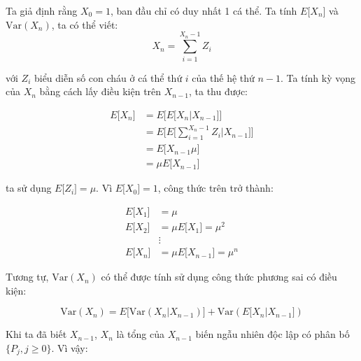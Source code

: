 \documentclass[14pt, a4paper]{article}
\numberwithin{equation}{section}
\numberwithin{figure}{section}
\theoremstyle{sltheorem}
\theoremstyle{soltheorem}
\numberwithin{dl}{section}
\numberwithin{vd}{section}
\begin{document}
    Ta giả định rằng $X_0 = 1$, ban đầu chỉ có duy nhất 1 cá thể.
    Ta tính $E \lbrack X_n \rbrack$ và $\mathrm{Var} (X_n)$, ta có thể viết:
    \begin{equation*}
        X_n = \sum_{i=1}^{X_n - 1} Z_i
    \end{equation*}

    với $Z_i$ biểu diễn số con cháu ở cá thể thứ $i$ của thế hệ thứ $n-1$.
    Ta tính kỳ vọng của $X_n$ bằng cách lấy điều kiện trên $X_{n-1}$, ta thu được:

    \begin{equation*}
        \begin{aligned}
            E \lbrack X_n \rbrack &= E \lbrack E \lbrack X_n \vert X_{n-1} \rbrack \rbrack \\
            &= E \Bigg \lbrack E \Bigg \lbrack \sum_{i=1}^{X_n - 1} Z_i \vert X_{n-1} \Bigg \rbrack \Bigg \rbrack \\
            &= E \lbrack X_{n-1} \mu \rbrack \\
            &= \mu E \lbrack X_{n-1} \rbrack
        \end{aligned}
    \end{equation*}

    ta sử dụng $E \lbrack Z_i \rbrack = \mu$. Vì $E \lbrack X_0 \rbrack = 1$, công thức trên trở thành:

    \begin{equation*}
        \begin{aligned}
            E \lbrack X_1 \rbrack &= \mu \\
            E \lbrack X_2 \rbrack &= \mu E \lbrack X_1 \rbrack = \mu^2 \\
            & \vdots \\
            E \lbrack X_n \rbrack &= \mu E \lbrack X_{n-1} \rbrack = \mu^n
        \end{aligned}
    \end{equation*}

    Tương tự, $\mathrm{Var} (X_n)$ có thể được tính sử dụng công thức phương sai có điều kiện:

    \begin{equation*}
        \mathrm{Var} (X_n) = E \lbrack \mathrm{Var} (X_n \vert X_{n-1}) \rbrack + \mathrm{Var} (E \lbrack X_n \vert X_{n-1} \rbrack)
    \end{equation*}

    Khi ta đã biết $X_{n-1}$, $X_n$ là tổng của $X_{n-1}$ biến ngẫu nhiên độc lập có phân bố $\lbrace P_j, j \geq 0 \rbrace$.
    Vì vậy:
\end{document}
